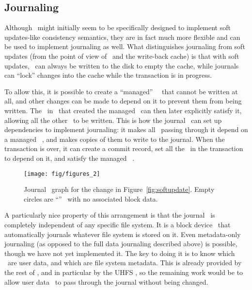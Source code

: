 \subsection{Journaling}
\label{sec:consistency:journal}

Although \chdescs\ might initially seem to be specifically designed to
implement soft updates-like consistency semantics, they are in fact much more
flexible and can be used to implement journaling as well. What distinguishes
journaling from soft updates (from the point of view of \chdescs\ and
the write-back cache) is that with soft updates, \chdescs\ can always
be written to the disk to empty the cache, while journals can ``lock'' changes
into the cache while the transaction is in progress.

To allow this, it is possible to create a ``managed'' \noop\ \chdesc\ that
cannot be written at all, and other changes can be made to depend on it to
prevent them from being written. The \module\ in \Kudos\ that created the
managed \chdesc\ can then later explicitly satisfy it, allowing all the other
\chdescs\ to be written. This is how the journal \module\ can set up
dependencies to implement journaling: it makes all \chdescs\ passing through it
depend on a managed \noop\ \chdesc, and makes copies of them to write to the
journal. When the transaction is over, it can create a commit record, set all
the \chdescs\ in the transaction to depend on it, and satisfy the managed \noop\
\chdesc.

\begin{figure}
  \centering
  \texttt{[image: fig/figures\_2]}
  \caption{\label{fig:journal} Journal \chdesc\ graph for the
    change in Figure~\ref{fig:softupdate}. Empty circles are
    ``\noop'' \chdescs\ with no associated block data.}
\end{figure}

A particularly nice property of this arrangement is that the journal \module\
is completely independent of any specific file system. It is a block device
\module\ that automatically journals whatever file system is stored on it. Even
metadata-only journaling (as opposed to the full data journaling described
above) is possible, though we have not yet implemented it. The key to doing it
is to know which \chdescs\ are user data, and which are file system metadata.
This is already provided by the rest of \Kudos, and in particular by the UHFS
\module, so the remaining work would be to allow user data \chdescs\ to pass
through the journal without being changed.
